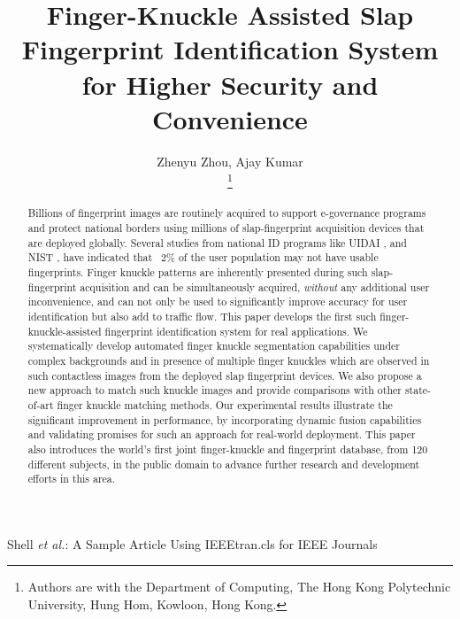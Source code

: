 \documentclass[lettersize, journal]{IEEEtran}
\begin{document}
\title{Finger-Knuckle Assisted Slap Fingerprint Identification System for Higher Security and Convenience}

\author{{Zhenyu Zhou, Ajay Kumar}

\thanks{Authors are with the Department of Computing, The Hong Kong Polytechnic University, Hung Hom, Kowloon, Hong Kong.}}

%
{Shell \MakeLowercase{\textit{et al.}}: A Sample Article Using IEEEtran.cls for IEEE Journals}

\maketitle

\begin{abstract}
  Billions of fingerprint images are routinely acquired to support e-governance programs and protect national borders using millions of slap-fingerprint acquisition devices that are deployed globally. Several studies from national ID programs like UIDAI \cite{uidai}, and NIST \cite{2002SUMMARYON}, have indicated that ~2\% of the user population may not have usable fingerprints. Finger knuckle patterns are inherently presented during such slap-fingerprint acquisition and can be simultaneously acquired, \textit{without} any additional user inconvenience, and can not only be used to significantly improve accuracy for user identification but also add to traffic flow. This paper develops the first such finger-knuckle-assisted fingerprint identification system for real applications. We systematically develop automated finger knuckle segmentation capabilities under complex backgrounds and in presence of multiple finger knuckles which are observed in such contactless images from the deployed slap fingerprint devices. We also propose a new approach to match such knuckle images and provide comparisons with other state-of-art finger knuckle matching methods. Our experimental results illustrate the significant improvement in performance, by incorporating dynamic fusion capabilities and validating promises for such an approach for real-world deployment. This paper also introduces the world’s first joint finger-knuckle and fingerprint database, from 120 different subjects, in the public domain to advance further research and development efforts in this area.

\end{abstract}
\end{document}

